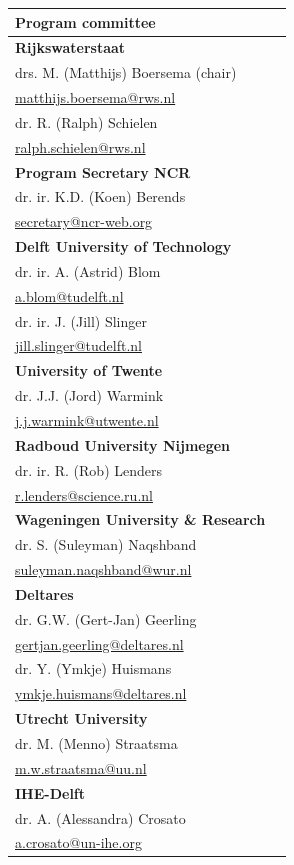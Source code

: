 
	\begin{table}
		\begin{tabular}[t]{ll}
        \textbf{Program committee}\\
        \hline
            \textbf{Rijkswaterstaat} \\
                drs. M. (Matthijs) Boersema (chair) \\
                \url{matthijs.boersema@rws.nl} \\
                dr. R. (Ralph) Schielen \\
                \url{ralph.schielen@rws.nl} \\
        	\textbf{Program Secretary NCR} \\
    	   	   dr. ir. K.D. (Koen) Berends\\
    		  \url{secretary@ncr-web.org} \\
         	
    		\textbf{Delft University of Technology}\\
    		  dr. ir. A. (Astrid) Blom\\
    		  \url{a.blom@tudelft.nl}\\
        		dr. ir. J. (Jill) Slinger\\ 
        		\url{jill.slinger@tudelft.nl}\\
        	\textbf{University of Twente}\\
        		dr. J.J. (Jord) Warmink\\
        		\url{j.j.warmink@utwente.nl}\\
    		\textbf{Radboud University Nijmegen}\\
        		dr. ir. R. (Rob) Lenders\\
        		\url{r.lenders@science.ru.nl}\\
            \textbf{Wageningen University \& Research}\\
                dr. S. (Suleyman) Naqshband\\
                \url{suleyman.naqshband@wur.nl}\\
            \textbf{Deltares}\\
                dr. G.W. (Gert-Jan) Geerling\\
                \url{gertjan.geerling@deltares.nl}\\
                dr. Y. (Ymkje) Huismans \\
                \url{ymkje.huismans@deltares.nl}\\
            \textbf{Utrecht University}\\
                dr. M. (Menno) Straatsma\\
                \url{m.w.straatsma@uu.nl}\\
            \textbf{IHE-Delft}\\
                dr. A. (Alessandra) Crosato\\
                \url{a.crosato@un-ihe.org}\\
                

\end{tabular}
\end{table}
